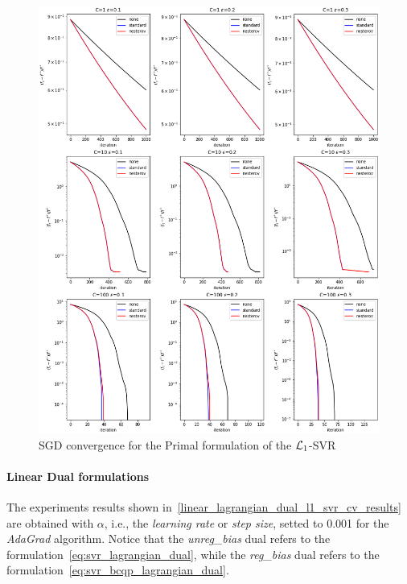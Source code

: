 \begin{figure}[H]
	\centering
	\includegraphics[scale=0.5]{img/l1_svr_loss_history}
	\caption{SGD convergence for the Primal formulation of the $\protect \mathcal{L}_1$-SVR}
	\label{fig:l1_svr_loss_history}
\end{figure}

\pagebreak

\paragraph{Linear Dual formulations}

The experiments results shown in~\ref{linear_lagrangian_dual_l1_svr_cv_results} are obtained with $\alpha$, i.e., the \emph{learning rate} or \emph{step size}, setted to 0.001 for the \emph{AdaGrad} algorithm. Notice that the \emph{unreg\_bias} dual refers to the formulation~\eqref{eq:svr_lagrangian_dual}, while the \emph{reg\_bias} dual refers to the formulation~\eqref{eq:svr_bcqp_lagrangian_dual}.



